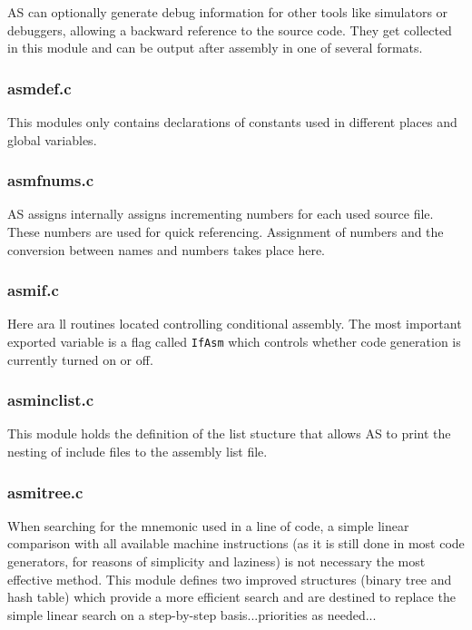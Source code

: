 \documentclass[12pt,twoside]{report}
\newcommand{\tty}[1]{{\tt #1}}
\begin{document}
AS can optionally generate debug information for other tools like
simulators or debuggers, allowing a backward reference to the source code. 
They get collected in this module and can be output after assembly in one
of several formats.

\subsubsection{asmdef.c}

This modules only contains declarations of constants used in different
places and global variables.

\subsubsection{asmfnums.c}

AS assigns internally assigns incrementing numbers for each used source
file.  These numbers are used for quick referencing.  Assignment of
numbers and the conversion between names and numbers takes place here.

\subsubsection{asmif.c}

Here ara ll routines located controlling conditional assembly.  The most
important exported variable is a flag called \tty{IfAsm} which controls
whether code generation is currently turned on or off.

\subsubsection{asminclist.c}

This module holds the definition of the list stucture that allows AS to
print the nesting of include files to the assembly list file.

\subsubsection{asmitree.c}

When searching for the mnemonic used in a line of code, a simple linear
comparison with all available machine instructions (as it is still done in
most code generators, for reasons of simplicity and laziness) is not
necessary the most effective method.  This module defines two improved
structures (binary tree and hash table) which provide a more efficient
search and are destined to replace the simple linear search on a
step-by-step basis...priorities as needed...
\end{document}

